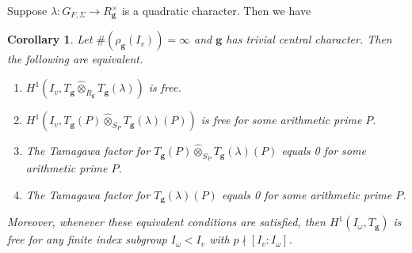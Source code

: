 \documentclass[10pt]{amsart}
\numberwithin{equation}{section}
\newtheorem{cor}[thm]{Corollary}
\theoremstyle{definition}
\theoremstyle{remark} %
\newcommand{\g}{\mathbf{g}}
\begin{document}
	Suppose $ \lambda \colon G_{F,\Sigma} \rightarrow R_\g^{\times} $ is a quadratic character. Then we have
	\begin{cor}
		\label{cor:4.17}
		Let $ \#(\rho_\g(I_{v}))= \infty $ and $ \g  $ has trivial central character. Then the following are equivalent.
		\begin{enumerate}[(1)]
			\item $ H^1(I_{v}, T_\g \widehat{\otimes}_{R_\g} T_\g (\lambda)) $ is free.
			\item $ H^1(I_{v}, T_\g(P) \widehat{\otimes}_{S_{P}} T_\g(\lambda)(P)) $ is free for some arithmetic prime $ P $.
			\item The Tamagawa factor for $ T_\g(P) \widehat{\otimes}_{S_{P}} T_\g(\lambda)(P) $ equals 0 for some arithmetic prime $ P $.
			\item The Tamagawa factor for $ T_\g(\lambda)(P) $ equals 0 for some arithmetic prime $ P $.
		\end{enumerate}
		Moreover, whenever these equivalent conditions are satisfied, then $ H^1(I_{\omega}, T_\g) $ is free for any finite index subgroup $ I_\omega < I_v $ with $ p \nmid [I_v \colon I_\omega] $.
	\end{cor}
\end{document}
